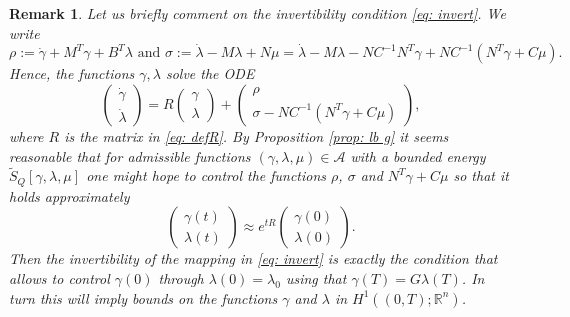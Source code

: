 \documentclass[11pt]{article}
\newcommand{\R}{\mathbb R}
\newtheorem{remark}{Remark}[section]
\begin{document}
\begin{remark}
    Let us briefly comment on the invertibility condition \eqref{eq: invert}. We write 
    \[
    \rho := \dot{\gamma} + M^T \gamma + B^T \lambda \text{ and } \sigma := \dot{\lambda} - M \lambda + N\mu = \dot{\lambda} - M \lambda - N C^{-1} N^T\gamma + NC^{-1} ( N^T \gamma + C \mu).
    \]
    Hence, the functions $\gamma, \lambda$ solve the ODE
    \[
    \begin{pmatrix}
        \dot{\gamma} \\ \dot{\lambda}
    \end{pmatrix} = R \begin{pmatrix}
        \gamma \\ \lambda
    \end{pmatrix} + \begin{pmatrix}
        \rho \\ \sigma - NC^{-1}(N^T \gamma + C \mu)
    \end{pmatrix},
    \]
    where $R$ is the matrix in \eqref{eq: defR}. 
    By Proposition \ref{prop: lb g} it seems reasonable that for admissible functions $(\gamma,\lambda,\mu) \in \mathcal{A}$ with a bounded energy $\tilde{S}_Q[\gamma,\lambda,\mu]$ one might hope to control the functions $\rho$, $\sigma$ and $N^T \gamma + C \mu$ so that it holds approximately
    \[
    \begin{pmatrix}
        \gamma(t) \\ \lambda(t)
    \end{pmatrix} \approx e^{tR} \begin{pmatrix}
        \gamma(0) \\ \lambda(0)
    \end{pmatrix}.
    \]
    Then the invertibility of the mapping in \eqref{eq: invert} is exactly the condition that allows to control $\gamma(0)$ through $\lambda(0) = \lambda_0$ using that $\gamma(T) = G \lambda(T)$. In turn this will imply bounds on the functions $\gamma$ and $\lambda$ in $H^1((0,T);\R^n)$.
\end{remark}
\end{document}
